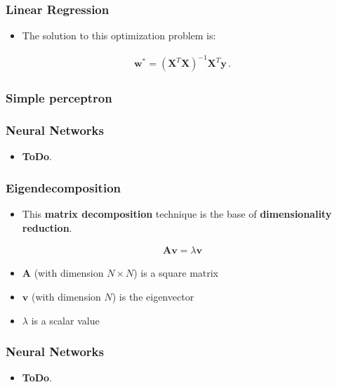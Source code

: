 \documentclass[handout]{beamer}
\begin{document}
\begin{frame}[fragile]
    \frametitle{Linear Regression}
    \Large
    \begin{itemize}
        \item The solution to this optimization problem is:
    \end{itemize}
    \begin{align*}
        \boldsymbol{w^{*}} = (\boldsymbol{X}^T\boldsymbol{X})^{-1}\boldsymbol{X}^{T}\boldsymbol{y}\,.
    \end{align*}
\end{frame}


\begin{frame}[fragile]\frametitle{Simple perceptron}
  \begin{figure}[htb]
        \centering
        
        \label{fig:perceptron}
	\end{figure}
\end{frame}

\begin{frame}[fragile]\frametitle{Neural Networks}
    \begin{itemize}
        \item \textbf{ToDo}.
    \end{itemize}
\end{frame}

\begin{frame}[fragile]\frametitle{Eigendecomposition}
    \Large
    \begin{itemize}
        \item This \textbf{matrix decomposition} technique is the base of \textbf{dimensionality reduction}.
    \end{itemize}
    \begin{align*}
        \boldsymbol{Av} = \lambda \boldsymbol{v}
    \end{align*}
    \begin{itemize}
        \item $\boldsymbol{A}$ (with dimension $N\times N$) is a square matrix
        \item $\boldsymbol{v}$ (with dimension $N$) is the eigenvector
        \item $\lambda$ is a scalar value
    \end{itemize}
\end{frame}

\begin{frame}[fragile]\frametitle{Neural Networks}
    \begin{itemize}
        \item \textbf{ToDo}.
    \end{itemize}
\end{frame}
\end{document}
